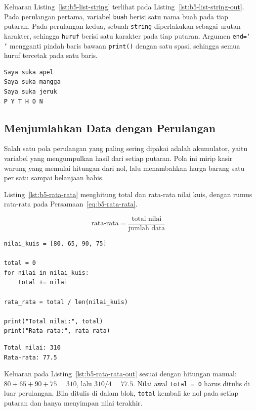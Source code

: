 Keluaran Listing~\ref{lst:b5-list-string} terlihat pada Listing~\ref{lst:b5-list-string-out}. Pada perulangan pertama, variabel \texttt{buah} berisi satu nama buah pada tiap putaran. Pada perulangan kedua, sebuah \texttt{string} diperlakukan sebagai urutan karakter, sehingga \texttt{huruf} berisi satu karakter pada tiap putaran. Argumen \texttt{end=' '} mengganti pindah baris bawaan \texttt{print()} dengan satu spasi, sehingga semua huruf tercetak pada satu baris.

\begin{lstlisting}[language=bash, caption={Keluaran list_and_string_iteration.py}, label={lst:b5-list-string-out}]
Saya suka apel
Saya suka mangga
Saya suka jeruk
P Y T H O N
\end{lstlisting}

\subsection{Menjumlahkan Data dengan Perulangan}
Salah satu pola perulangan yang paling sering dipakai adalah akumulator, yaitu variabel yang mengumpulkan hasil dari setiap putaran. Pola ini mirip kasir warung yang memulai hitungan dari nol, lalu menambahkan harga barang satu per satu sampai belanjaan habis.

Listing~\ref{lst:b5-rata-rata} menghitung total dan rata-rata nilai kuis, dengan rumus rata-rata pada Persamaan~\eqref{eq:b5-rata-rata}.

\begin{equation}
  \text{rata-rata} = \frac{\text{total nilai}}{\text{jumlah data}}
  \label{eq:b5-rata-rata}
\end{equation}

\begin{lstlisting}[style=PythonStyle, caption={Kode Python: rata_rata_kuis.py}, label={lst:b5-rata-rata}]
nilai_kuis = [80, 65, 90, 75]

total = 0
for nilai in nilai_kuis:
    total += nilai

rata_rata = total / len(nilai_kuis)

print("Total nilai:", total)
print("Rata-rata:", rata_rata)
\end{lstlisting}

\begin{lstlisting}[language=bash, caption={Keluaran rata_rata_kuis.py}, label={lst:b5-rata-rata-out}]
Total nilai: 310
Rata-rata: 77.5
\end{lstlisting}

Keluaran pada Listing~\ref{lst:b5-rata-rata-out} sesuai dengan hitungan manual: $80 + 65 + 90 + 75 = 310$, lalu $310 / 4 = 77.5$. Nilai awal \texttt{total = 0} harus ditulis di luar perulangan. Bila ditulis di dalam blok, \texttt{total} kembali ke nol pada setiap putaran dan hanya menyimpan nilai terakhir.

